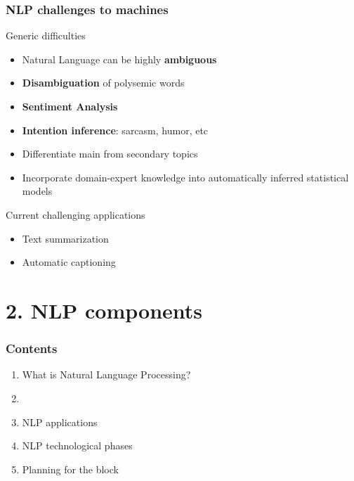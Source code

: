 \documentclass{beamer}
\begin{document}
\begin{frame}

	\frametitle{NLP challenges to machines}

	\large
	
	\begin{block}{Generic difficulties}
	\begin{itemize}
	
		\item Natural Language can be highly {\bf ambiguous}
		\item {\bf Disambiguation} of polysemic words
		\item {\bf Sentiment Analysis}
		\item {\bf Intention inference}: sarcasm, humor, etc
		\item Differentiate main from secondary topics
		\item Incorporate domain-expert knowledge into automatically inferred statistical models
	
	\end{itemize}
	\end{block}

	\begin{block}{Current challenging applications}
	\begin{itemize}
	
		\item Text summarization
		\item Automatic captioning
	
	\end{itemize}
	\end{block}


\end{frame}


\section{2. NLP components}

\begin{frame}

    \frametitle{Contents}

	\large

    \begin{enumerate}
  
    	\item What is Natural Language Processing?
    	\item {\bf \color{blue}{NLP components}}
    	\item NLP applications
    	\item NLP technological phases
    	\item Planning for the block
    
    \end{enumerate}

\end{frame}
\end{document}

